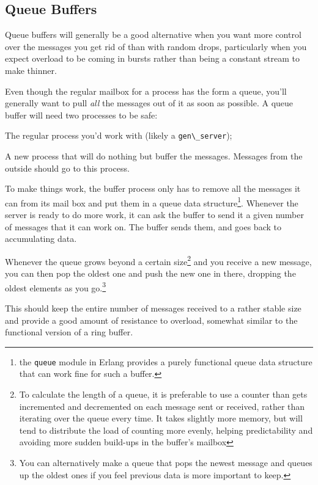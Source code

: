 \documentclass[11pt, oneside]{book}   	%
\newcommand{\module}[1]{\Verb`#1`}
\begin{document}
\subsection{Queue Buffers}

Queue buffers will generally be a good alternative when you want more control over the messages you get rid of than with random drops, particularly when you expect overload to be coming in bursts rather than being a constant stream to make thinner.

Even though the regular mailbox for a process has the form a queue, you'll generally want to pull \emph{all} the messages out of it as soon as possible. A queue buffer will need two processes to be safe:

\begin{itemize*}
	\item The regular process you'd work with (likely a \module{gen\_server});
	\item A new process that will do nothing but buffer the messages. Messages from the outside should go to this process.
\end{itemize*}

To make things work, the buffer process only has to remove all the messages it can from its mail box and put them in a queue data structure\footnote{the \module{queue} module in Erlang provides a purely functional queue data structure that can work fine for such a buffer.}. Whenever the server is ready to do more work, it can ask the buffer to send it a given number of messages that it can work on. The buffer sends them, and goes back to accumulating data.


Whenever the queue grows beyond a certain size\footnote{To calculate the length of a queue, it is preferable to use a counter than gets incremented and decremented on each message sent or received, rather than iterating over the queue every time. It takes slightly more memory, but will tend to distribute the load of counting more evenly, helping predictability and avoiding more sudden build-ups in the buffer's mailbox} and you receive a new message, you can then pop the oldest one and push the new one in there, dropping the oldest elements as you go.\footnote{You can alternatively make a queue that pops the newest message and queues up the oldest ones if you feel previous data is more important to keep.}

This should keep the entire number of messages received to a rather stable size and provide a good amount of resistance to overload, somewhat similar to the functional version of a ring buffer.
\end{document}
